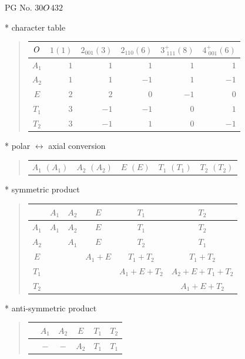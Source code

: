 \documentclass[fleqn,8pt,landscape]{jsarticle}
\begin{document}
\setcounter{MaxMatrixCols}{32}

\renewcommand{\tablename}{Table~}
\renewcommand{\figurename}{Figure~}
\begin{center}
\LARGE
PG No. 30\quad$O_{\rm }$\quad$432$\quad[ cubic ]
\end{center}

* character table
\begin{quote}
\begin{tabular}{crrrrr} \hline \hline
$ O_{\rm } $ & $ 1(1) $ & $ 2{}_{001}(3) $ & $ 2{}_{110}(6) $ & $ 3^{+}_{\,\,111}(8) $ & $ 4^{+}_{\,\,001}(6) $ \\ \hline
$ A_{1} $ & $ 1 $ & $ 1 $ & $ 1 $ & $ 1 $ & $ 1 $ \\
$ A_{2} $ & $ 1 $ & $ 1 $ & $ -1 $ & $ 1 $ & $ -1 $ \\
$ E $ & $ 2 $ & $ 2 $ & $ 0 $ & $ -1 $ & $ 0 $ \\
$ T_{1} $ & $ 3 $ & $ -1 $ & $ -1 $ & $ 0 $ & $ 1 $ \\
$ T_{2} $ & $ 3 $ & $ -1 $ & $ 1 $ & $ 0 $ & $ -1 $ \\
 \hline \hline
\end{tabular}
\end{quote}

* polar $\leftrightarrow$ axial conversion
\begin{quote}
\begin{tabular}{ccccc}
$ A_{1}\,\,(A_{1}) $ & $ A_{2}\,\,(A_{2}) $ & $ E\,\,(E) $ & $ T_{1}\,\,(T_{1}) $ & $ T_{2}\,\,(T_{2}) $
\end{tabular}
\end{quote}

* symmetric product
\begin{quote}
\begin{tabular}{c|ccccc} \hline \hline
 & $ A_{1} $ & $ A_{2} $ & $ E $ & $ T_{1} $ & $ T_{2} $ \\ \hline
$ A_{1} $ & $ A_{1} $ & $ A_{2} $ & $ E $ & $ T_{1} $ & $ T_{2} $ \\
$ A_{2} $ & $  $ & $ A_{1} $ & $ E $ & $ T_{2} $ & $ T_{1} $ \\
$ E $ & $  $ & $  $ & $ A_{1} + E $ & $ T_{1} + T_{2} $ & $ T_{1} + T_{2} $ \\
$ T_{1} $ & $  $ & $  $ & $  $ & $ A_{1} + E + T_{2} $ & $ A_{2} + E + T_{1} + T_{2} $ \\
$ T_{2} $ & $  $ & $  $ & $  $ & $  $ & $ A_{1} + E + T_{2} $ \\
 \hline \hline
\end{tabular}
\end{quote}

* anti-symmetric product
\begin{quote}
\begin{tabular}{cccccc} \hline \hline
 & $ A_{1} $ & $ A_{2} $ & $ E $ & $ T_{1} $ & $ T_{2} $ \\ \hline
$  $ & $ - $ & $ - $ & $ A_{2} $ & $ T_{1} $ & $ T_{1} $ \\
 \hline \hline
\end{tabular}
\end{quote}
\end{document}
